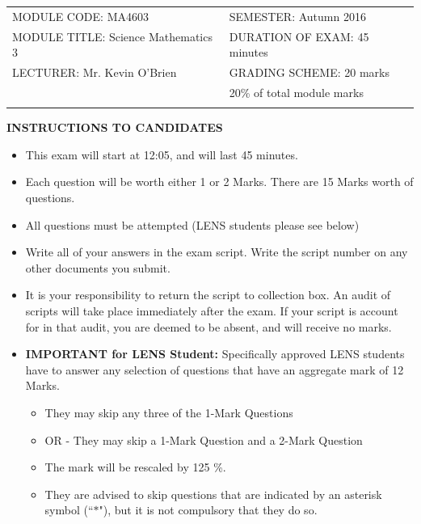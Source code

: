 \documentclass[a4paper,12pt]{article}
\begin{document}
\begin{tabular}{ll}
	MODULE CODE: MA4603 & SEMESTER: Autumn 2016\\[1cm]
	MODULE TITLE: Science Mathematics 3  & DURATION OF EXAM: 45 minutes \\[1cm]
	LECTURER: Mr. Kevin O'Brien & GRADING SCHEME: 20 marks \\
	& \phantom{GRadiC} \footnotesize {20\% of total module marks} \\[0.2cm]
	\\[1cm]
\end{tabular}
\begin{center}
	{\bf INSTRUCTIONS TO CANDIDATES}
\end{center}
\begin{itemize} 
	\item This exam will start at 12:05, and will last 45 minutes.
	
	\item Each question will be worth either 1 or 2 Marks. There are 15 Marks worth of questions.
	\item All questions must be attempted (LENS students please see below)
	
	\item Write all of your answers in the exam script. Write the script number on any other documents you submit.
	
	\item It is your responsibility to return the script to collection box. An audit of scripts will take place immediately after the exam. If your script is account for in that audit,  you are deemed to be absent, and will receive no marks.
	
	\item \textbf{IMPORTANT for LENS Student:}
	Specifically approved LENS students have to answer any selection of questions that have an aggregate mark of 12 Marks.  
	\begin{itemize}
		\item They may skip any three of the 1-Mark Questions
		\item OR - They may skip a 1-Mark Question and a 2-Mark Question
		\item The mark will be rescaled by 125 \%.
		\item They are advised to skip questions that are indicated by an asterisk symbol (``$\ast$"), but it is not compulsory that they do so.
	\end{itemize}
	
	
\end{itemize}
\newpage
\end{document}
